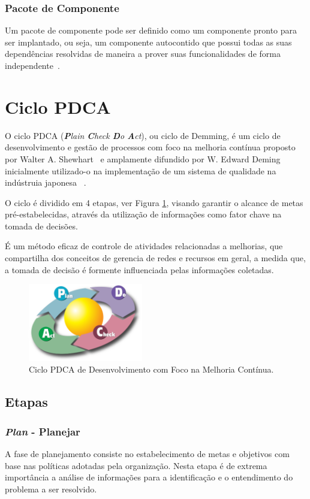 \subsubsection{Pacote de Componente}
Um pacote de componente pode ser definido como um componente pronto para ser implantado, ou seja, um componente autocontido que possui todas as suas dependências resolvidas de maneira a prover suas funcionalidades de forma independente~\cite{cervantes2005techical}.

\section{Ciclo PDCA}
\label{sec:pdca}
O ciclo PDCA (\textit{\textbf{P}lain \textbf{C}heck \textbf{D}o \textbf{A}ct}), ou ciclo de  Demming, é um ciclo de desenvolvimento e gestão de processos com foco na melhoria contínua proposto por Walter A. Shewhart~\cite{shewhart} e amplamente difundido por W. Edward Deming~\cite{deming} inicialmente utilizado-o na implementação de um sistema de qualidade na indústruia japonesa ~\cite{fabio2003}.

O ciclo é dividido em 4 etapas, ver Figura \ref{fig:pdca}, visando garantir o alcance de metas pré-estabelecidas, através da utilização de informações como fator chave na tomada de decisões.

É um método eficaz de controle de atividades relacionadas a melhorias, que compartilha dos conceitos de gerencia de redes e recursos em geral, a medida que, a tomada de decisão é formente influenciada pelas informações coletadas.

\begin{figure}[htp]
\centering
\includegraphics[width=5cm]{chapters/intro/pdca_cycle.png}
\caption[Ciclo PDCA]{Ciclo PDCA de Desenvolvimento com Foco na Melhoria Contínua.}
\label{fig:pdca}
\end{figure}


\subsection{Etapas}
\label{pdca:phases}
\subsubsection{\textit{Plan} - Planejar}
A fase de planejamento consiste no estabelecimento de metas e objetivos com base nas políticas adotadas pela organização. Nesta etapa é de extrema importância a análise de informações para a identificação e o entendimento do problema a ser resolvido.

